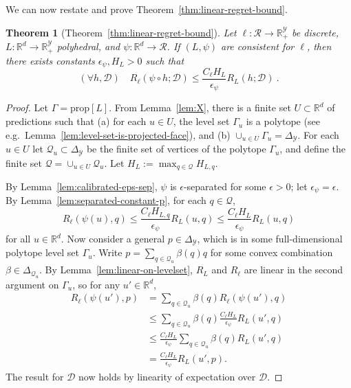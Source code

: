\documentclass[11pt]{article}
\newcommand{\Comments}{1}
\newcommand{\mynote}[2]{\ifnum\Comments=1\textcolor{#1}{#2}\fi}
\newcommand{\raf}[1]{\mynote{darkgreen}{[RF: #1]}}
\newcommand{\reals}{\mathbb{R}}
\newcommand{\prop}[1]{\mathrm{prop}[#1]}
\newcommand{\simplex}{\Delta_\Y}
\newcommand{\D}{\mathcal{D}}
\newcommand{\R}{\mathcal{R}}
\newcommand{\Y}{\mathcal{Y}}
\newtheorem*{theorem*}{Theorem}
\begin{document}
We can now restate and prove Theorem~\ref{thm:linear-regret-bound}.
\begin{theorem*}[Theorem~\ref{thm:linear-regret-bound}]
  Let $\ell: \R \to \reals_+^{\Y}$ be discrete, $L: \reals^d \to \reals_+^{\Y}$ polyhedral, and $\psi: \reals^d \to \R$.
  If $(L,\psi)$ are consistent for $\ell$, then there exists constants $\epsilon_\psi, H_L > 0$ such that
    \[ (\forall h,\D) \quad R_{\ell}(\psi \circ h ; \D) \leq \frac{C_{\ell} H_L}{\epsilon_{\psi}} R_L(h ; \D) ~. \]
\end{theorem*}
\begin{proof}
  Let $\Gamma = \prop{L}$.
  From Lemma~\ref{lem:X}, there is a finite set $U \subset \reals^d$ of predictions such that (a) for each $u \in U$, the level set $\Gamma_u$ is a polytope (see e.g.\ Lemma~\ref{lem:level-set-is-projected-face}), and (b) $\cup_{u \in U} \Gamma_u = \simplex$.
  For each $u\in U$ let $\mathcal{Q}_u \subset \simplex$ be the finite set of vertices of the polytope $\Gamma_u$, and define the finite set $\mathcal{Q} = \cup_{u \in U} \mathcal{Q}_u$.
  Let $H_L := \max_{q\in\mathcal{Q}} H_{L,q}$.
  
  By Lemma~\ref{lem:calibrated-eps-sep}, $\psi$ is $\epsilon$-separated for some $\epsilon>0$; let $\epsilon_{\psi} = \epsilon$.
  By Lemma~\ref{lem:separated-constant-p}, for each $q \in \mathcal{Q}$,
  \[ R_{\ell}(\psi(u),q) \leq \frac{C_{\ell} H_{L,q}}{\epsilon_{\psi}} R_L(u,q) \leq \frac{C_{\ell} H_L}{\epsilon_{\psi}} R_L(u,q)\]
  for all $u\in\reals^d$.
  Now consider a general $p \in \simplex$, which is in some full-dimensional polytope level set $\Gamma_u$.
  Write $p = \sum_{q \in \mathcal{Q}_u} \beta(q) q$ for some convex combination $\beta \in \Delta_{\mathcal Q_u}$.
  By Lemma~\ref{lem:linear-on-levelset}, $R_L$ and $R_{\ell}$ are linear in the second argument on $\Gamma_u$, so for any $u'\in\reals^d$,
  \begin{align*}
    R_{\ell}(\psi(u'),p)
    &=    \sum_{q \in \mathcal{Q}_u} \beta(q) R_{\ell}(\psi(u'), q)  \\
    &\leq \sum_{q \in \mathcal{Q}_u} \beta(q) \frac{C_{\ell} H_{L}}{\epsilon_{\psi}} R_L(u', q) \\
    &\leq \frac{C_{\ell} H_L}{\epsilon_{\psi}} \sum_{q \in \mathcal{Q}_u} \beta(q) R_L(u', q)  \\
    &= \frac{C_{\ell} H_L}{\epsilon_{\psi}} R_L(u', p) .
  \end{align*}
  The result for $\D$ now holds by linearity of expectation over $\D$.
\end{proof}
\end{document}
